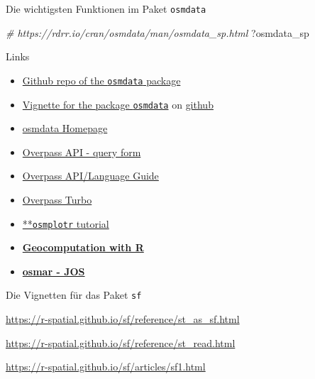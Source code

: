 \documentclass[ignorenonframetext,]{beamer}
\newenvironment{Shaded}{\begin{snugshade}}{\end{snugshade}}
\newcommand{\CommentTok}[1]{\textcolor[rgb]{0.56,0.35,0.01}{\textit{#1}}}
\newcommand{\NormalTok}[1]{#1}
\begin{document}
\begin{frame}[fragile]{Die wichtigsten Funktionen im Paket
\texttt{osmdata}}

\begin{Shaded}
\begin{Highlighting}[]
\CommentTok{# https://rdrr.io/cran/osmdata/man/osmdata_sp.html}
\NormalTok{?osmdata_sp}
\end{Highlighting}
\end{Shaded}

\end{frame}

\begin{frame}[fragile]{Links}

\begin{itemize}
\item
  \href{https://github.com/ropensci/osmdata}{Github repo of the
  \texttt{osmdata} package}
\item
  \href{https://cran.r-project.org/web/packages/osmdata/vignettes/osmdata.html}{Vignette
  for the package \texttt{osmdata}} on
  \href{https://github.com/ropensci/osmdata/blob/master/vignettes/osmdata.Rmd}{github}
\item
  \href{https://ropensci.github.io/osmdata/}{osmdata Homepage}
\item
  \href{http://overpass-api.de/query_form.html}{Overpass API - query
  form}
\item
  \href{https://wiki.openstreetmap.org/wiki/DE:Overpass_API/Language_Guide}{Overpass
  API/Language Guide}
\item
  \href{https://wiki.openstreetmap.org/wiki/DE:Overpass_turbo}{Overpass
  Turbo} 
\item
  \href{https://ropensci.org/tutorials/osmplotr_tutorial/}{**\texttt{osmplotr}
  tutorial}
\item
  \href{https://bookdown.org/robinlovelace/geocompr/}{\textbf{Geocomputation
  with R}}
\item
  \href{https://www.theoj.org/joss-papers/joss.00305/10.21105.joss.00305.pdf}{\textbf{osmar
  - JOS}}
\end{itemize}

\begin{block}{Die Vignetten für das Paket \texttt{sf}}

\url{https://r-spatial.github.io/sf/reference/st_as_sf.html}

\url{https://r-spatial.github.io/sf/reference/st_read.html}

\url{https://r-spatial.github.io/sf/articles/sf1.html}

\end{block}

\end{frame}
\end{document}
